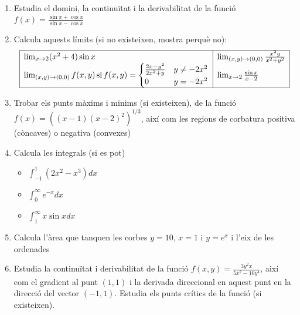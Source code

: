 \documentclass[]{article}
\begin{document}
\begin{enumerate}
  \item Estudia el domini, la continuïtat i la derivabilitat de la funció $f(x)=\frac{\sin{x}+\cos{x}}{\sin{x}-\cos{x}}$
  \item Calcula aquests límits (si no existeixen, mostra perquè no):
   \[
    \begin{array}{|l|l|}
      \hline
      \lim_{x \rightarrow 2} (x^2+4)\sin{x} &
      \lim_{(x,y) \rightarrow (0,0)} \frac{x^2y}{x^2+y^2}\\
      \lim_{(x,y) \rightarrow (0,0)} f(x,y) \, \mathrm{si}\, f(x,y)=\begin{cases}\frac{2x-y^2}{2x^2+y} & y \neq -2x^2\\0& y = -2x^2\end{cases} &
      \lim_{x \rightarrow 2} \frac{\sin{x}}{x-2}\\\hline
    \end{array}
    \]
  \item Trobar els punts màxims i minims (si existeixen), de la funció $f(x)=\left((x-1)(x-2)^2\right)^{1/3}$, així com les regions de corbatura positiva (còncaves) o negativa (convexes)
  \item Calcula les integrals (si es pot)
  \begin{itemize}
    \item $\int_{-1}^{1} (2x^2-x^3) dx$
    \item $\int_{0}^{\infty} e^{-x}dx$
    \item $\int_1^{\infty} x \sin{x}dx$

  \end{itemize}
  \item Calcula l'àrea que tanquen les corbes $y=10$, $x=1$ i $y=e^x$ i l'eix de les ordenades
  \item Estudia la continuïtat i derivabilitat de la funció $f(x,y)=\frac{3y^2x}{5x^2-10y^4}$, així com el gradient al punt $(1,1)$ i la derivada direccional en aquest punt en la direcció del vector $(-1,1)$. Estudia els punts crítics de la funció (si existeixen).
\end{enumerate}
\end{document}
